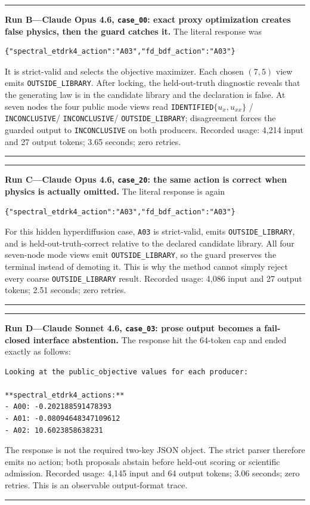 \documentclass{article}
\newcommand{\ID}{\texttt{IDENTIFIED}\xspace}
\newcommand{\OUT}{\texttt{OUTSIDE\_LIBRARY}\xspace}
\newcommand{\INC}{\texttt{INCONCLUSIVE}\xspace}
\begin{document}
\medskip
\noindent\begin{minipage}{\linewidth}
\hrule\smallskip
\textbf{Run B---Claude Opus 4.6, \texttt{case\_00}: exact proxy optimization creates false
physics, then the guard catches it.}
The literal response was
\begin{verbatim}
{"spectral_etdrk4_action":"A03","fd_bdf_action":"A03"}
\end{verbatim}
It is strict-valid and selects the objective maximizer. Each chosen $(7,5)$ view emits \OUT.
After locking, the held-out-truth diagnostic reveals that the generating law is in the candidate library and the
declaration is false. At seven nodes the four public mode views read
\ID $\{u_x,u_{xx}\}$ / \INC / \INC / \OUT; disagreement forces the guarded output to \INC on
both producers. Recorded usage: 4,214 input and 27 output tokens; 3.65 seconds; zero retries.
\smallskip\hrule
\end{minipage}

\medskip
\noindent\begin{minipage}{\linewidth}
\hrule\smallskip
\textbf{Run C---Claude Opus 4.6, \texttt{case\_20}: the same action is correct when physics is
actually omitted.}
The literal response is again
\begin{verbatim}
{"spectral_etdrk4_action":"A03","fd_bdf_action":"A03"}
\end{verbatim}
For this hidden hyperdiffusion case, \texttt{A03} is strict-valid, emits \OUT, and is held-out-truth-correct
relative to the declared candidate library. All four seven-node mode views emit \OUT, so the guard preserves
the terminal instead of demoting it. This is why the method cannot simply reject every coarse
\OUT result. Recorded usage: 4,086 input and 27 output tokens; 2.51 seconds; zero retries.
\smallskip\hrule
\end{minipage}

\medskip
\noindent\begin{minipage}{\linewidth}
\hrule\smallskip
\textbf{Run D---Claude Sonnet 4.6, \texttt{case\_03}: prose output becomes a fail-closed
interface abstention.}
The response hit the 64-token cap and ended exactly as follows:
\begin{verbatim}
Looking at the public_objective values for each producer:

**spectral_etdrk4_actions:**
- A00: -0.202188591478393
- A01: -0.08094648347109612
- A02: 10.6023858638231
\end{verbatim}
The response is not the required two-key JSON object. The strict parser therefore emits no action;
both proposals abstain before held-out scoring or scientific admission. Recorded usage: 4,145 input
and 64 output tokens; 3.06 seconds; zero retries. This is an observable output-format trace.
\smallskip\hrule
\end{minipage}
\end{document}
